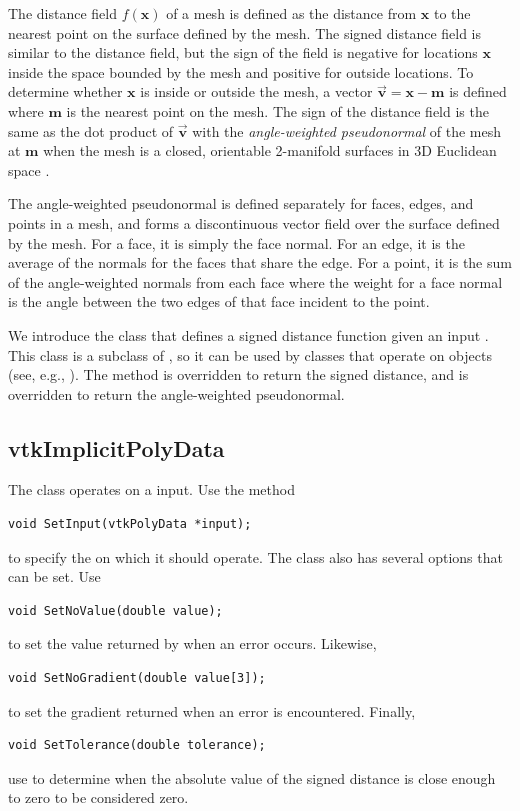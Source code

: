 \documentclass{InsightArticle}
\def\x{{\mathbf x}}
\def\m{{\mathbf m}}
\def\v{{\overrightarrow{\mathbf v}}}
\begin{document}
The distance field $f(\x)$ of a mesh is defined as the distance from $\x$ to the nearest point on the surface defined by the mesh. The signed distance field is similar to the distance field, but the sign of the field is negative for locations $\x$ inside the space bounded by the mesh and positive for outside locations. To determine whether $\x$ is inside or outside the mesh, a vector $\v = \x - \m$ is defined where $\m$ is the nearest point on the mesh. The sign of the distance field is the same as the dot product of $\v$ with the \emph{angle-weighted pseudonormal} of the mesh at $\m$ when the mesh is a closed, orientable 2-manifold surfaces in 3D Euclidean space \cite{Baerentzen2005}.  

The angle-weighted pseudonormal is defined separately for faces, edges, and points in a mesh, and forms a discontinuous vector field over the surface defined by the mesh. For a face, it is simply the face normal. For an edge, it is the average of the normals for the faces that share the edge. For a point, it is the sum of the angle-weighted normals from each face where the weight for a face normal is the angle between the two edges of that face incident to the point.

We introduce the  class that defines a signed distance function given an input . This class is a subclass of , so it can be used by classes that operate on  objects (see, e.g., ). The method  is overridden to return the signed distance, and  is overridden to return the angle-weighted pseudonormal.

\subsection{vtkImplicitPolyData}

The class  operates on a  input. Use the method
\begin{verbatim}
void SetInput(vtkPolyData *input);
\end{verbatim}
to specify the  on which it should operate. The class also has several options that can be set. Use
\begin{verbatim}
void SetNoValue(double value);
\end{verbatim}
to set the value returned by  when an error occurs. Likewise,
\begin{verbatim}
void SetNoGradient(double value[3]);
\end{verbatim}
to set the gradient returned when an error is encountered. Finally,
\begin{verbatim}
void SetTolerance(double tolerance);
\end{verbatim}
use to determine when the absolute value of the signed distance is close enough to zero to be considered zero.
\end{document}
